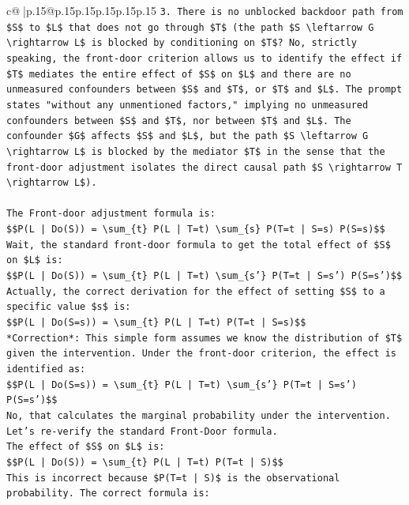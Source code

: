 \documentclass{article}
\begin{document}
{\begin{supertabular}{c@{$\;$}|p{.15\linewidth}@{}p{.15\linewidth}p{.15\linewidth}p{.15\linewidth}p{.15\linewidth}p{.15\linewidth}}
{{{\texttt{3.  There is no unblocked backdoor path from \$S\$ to \$L\$ that does not go through \$T\$ (the path \$S \textbackslash{}leftarrow G \textbackslash{}rightarrow L\$ is blocked by conditioning on \$T\$? No, strictly speaking, the front{-}door criterion allows us to identify the effect if \$T\$ mediates the entire effect of \$S\$ on \$L\$ and there are no unmeasured confounders between \$S\$ and \$T\$, or \$T\$ and \$L\$. The prompt states "without any unmentioned factors," implying no unmeasured confounders between \$S\$ and \$T\$, nor between \$T\$ and \$L\$. The confounder \$G\$ affects \$S\$ and \$L\$, but the path \$S \textbackslash{}leftarrow G \textbackslash{}rightarrow L\$ is blocked by the mediator \$T\$ in the sense that the front{-}door adjustment isolates the direct causal path \$S \textbackslash{}rightarrow T \textbackslash{}rightarrow L\$).} \\
\\ 
\texttt{The Front{-}door adjustment formula is:} \\
\texttt{\$\$P(L | Do(S)) = \textbackslash{}sum\_\{t\} P(L | T=t) \textbackslash{}sum\_\{s\} P(T=t | S=s) P(S=s)\$\$} \\
\texttt{Wait, the standard front{-}door formula to get the total effect of \$S\$ on \$L\$ is:} \\
\texttt{\$\$P(L | Do(S)) = \textbackslash{}sum\_\{t\} P(L | T=t) \textbackslash{}sum\_\{s'\} P(T=t | S=s') P(S=s')\$\$} \\
\texttt{Actually, the correct derivation for the effect of setting \$S\$ to a specific value \$s\$ is:} \\
\texttt{\$\$P(L | Do(S=s)) = \textbackslash{}sum\_\{t\} P(L | T=t) P(T=t | S=s)\$\$} \\
\texttt{*Correction*: This simple form assumes we know the distribution of \$T\$ given the intervention. Under the front{-}door criterion, the effect is identified as:} \\
\texttt{\$\$P(L | Do(S=s)) = \textbackslash{}sum\_\{t\} P(L | T=t) \textbackslash{}sum\_\{s'\} P(T=t | S=s') P(S=s')\$\$} \\
\texttt{No, that calculates the marginal probability under the intervention. Let's re{-}verify the standard Front{-}Door formula.} \\
\texttt{The effect of \$S\$ on \$L\$ is:} \\
\texttt{\$\$P(L | Do(S)) = \textbackslash{}sum\_\{t\} P(L | T=t) P(T=t | S)\$\$} \\
\texttt{This is incorrect because \$P(T=t | S)\$ is the observational probability. The correct formula is:} \\
}}}
\end{supertabular}}
\end{document}
